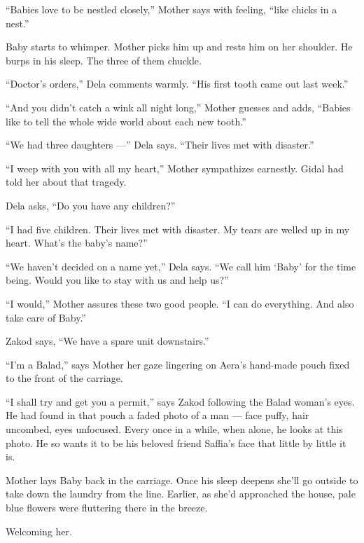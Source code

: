 \documentclass[twoside,11pt,openany]{book}
\begin{document}
``Babies love to be nestled closely,'' Mother says with feeling, ``like chicks in
a nest.''

Baby starts to whimper. Mother picks him up and rests him on her shoulder.  He burps in his sleep. The three of them
chuckle.

``Doctor's orders,'' Dela comments warmly. ``His first tooth came out last
week.''

``And you didn't catch a wink all night long,'' Mother guesses and adds, ``Babies
like to tell the whole wide world about each new tooth.''

``We had three daughters ---'' Dela says. ``Their lives met with
disaster.''

``I weep with you with all my heart,'' Mother sympathizes earnestly. Gidal had told her about
that tragedy.

Dela asks, ``Do you have any children?''

``I had five children. Their lives met with disaster. My tears are welled up in my heart. What's the baby's
name?''

``We haven't decided on a name yet,'' Dela says. ``We call him `Baby' for the
time being. Would you like to stay with us and help us?''

``I would,'' Mother assures these two good people. ``I can do everything. And
also take care of Baby.''

Zakod says, ``We have a spare unit downstairs.''

``I'm a Balad,'' says Mother her gaze lingering on Aera's hand-made pouch
fixed to the front of the carriage.

``I shall try and get you a permit,'' says Zakod following the Balad woman's eyes. He had
found in that pouch a faded photo of a man --- face puffy, hair uncombed, eyes unfocused. Every once in a while, when
alone, he looks at this photo. He so wants it to be his beloved friend Saffia's face that little by little it is.

Mother lays Baby back in the carriage. Once his sleep deepens she'll go outside to take down the laundry from the line.
Earlier, as she'd approached the house, pale blue flowers were fluttering there in the breeze.

Welcoming her.
\end{document}
